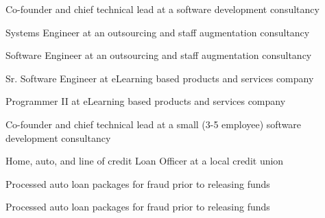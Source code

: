 
Co-founder and chief technical lead at a software development consultancy

\newpage

\divider

Systems Engineer at an outsourcing and staff augmentation consultancy

\divider

Software Engineer at an outsourcing and staff augmentation consultancy

\divider

Sr. Software Engineer at eLearning based products and services company

\divider

Programmer II at eLearning based products and services company

\divider

Co-founder and chief technical lead at a small (3-5 employee) software development consultancy 

\divider

Home, auto, and line of credit Loan Officer at a local credit union

\divider

Processed auto loan packages for fraud prior to releasing funds

\divider

Processed auto loan packages for fraud prior to releasing funds

\bigskip
